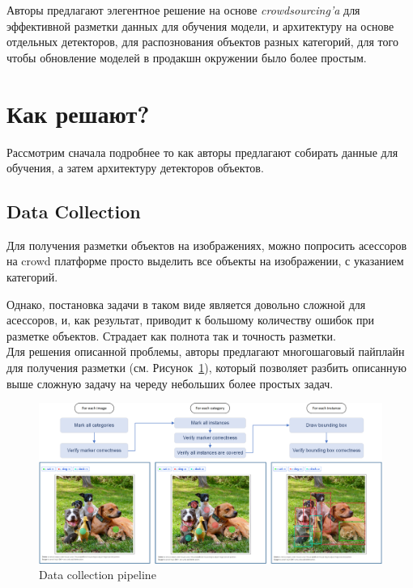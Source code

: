 Авторы предлагают элегентное решение на основе \textit{crowdsourcing'a} для эффективной разметки данных для обучения модели, и архитектуру на основе  отдельных детекторов, для распознования объектов разных категорий, для того чтобы обновление моделей в продакшн окружении было более простым.

\section*{Как решают?}

Рассмотрим сначала подробнее то как авторы предлагают собирать данные для обучения, а затем архитектуру детекторов объектов.

\subsection*{Data Collection}

Для получения разметки объектов на изображениях, можно попросить асессоров на crowd платформе просто выделить все объекты на изображении, с указанием категорий.

Однако, постановка задачи в таком виде является довольно сложной для асессоров, и, как результат, приводит к большому количеству ошибок при разметке объектов.
Страдает как полнота так и точность разметки. \\

Для решения описанной проблемы, авторы предлагают многошаговый пайплайн для получения разметки (см. Рисунок~\ref{fig:bing_data_collection}), который позволяет разбить описанную выше сложную задачу на череду небольших более простых задач.

\begin{figure}[ht]
  \centering
  \includegraphics[width=0.9\linewidth]{images/bing_data_collection.png}
  \caption{\footnotesize{Data collection pipeline}}
  \label{fig:bing_data_collection}
\end{figure}

